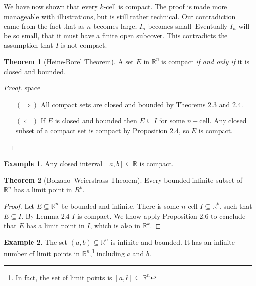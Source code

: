 \documentclass{article}
\newcommand{\R}{\mathbb{R}}
\theoremstyle{definition}
\newtheorem{theorem}{Theorem}[section]
\newtheorem{example}{Example}[section]
\begin{document}
	We have now shown that every $ k $-cell is compact. The proof is made more manageable with illustrations, but is still rather technical. Our contradiction came from the fact that as $ n $ becomes large, $ I_n $ becomes small. Eventually $ I_n $ will be so small, that it must have a finite open subcover. This contradicts the assumption that $ I $ is not compact. 
	\begin{theorem}[Heine-Borel Theorem]
		A set $ E $ in $ \R^n $ is compact \textit{if and only if} it is closed and bounded.
	\end{theorem} 
	\begin{proof}{\color{white}space}
		\begin{enumerate}
			\item [$ (\Longrightarrow) $] All compact sets are closed and bounded by Theorems 2.3 and 2.4. 
			\item [$ (\Longleftarrow) $] If $ E $ is closed and bounded then $ E\subseteq I $ for some $ n -$cell. Any closed subset of a compact set is compact by Proposition 2.4, so $ E $ is compact.
		\end{enumerate}
	\end{proof}
	\begin{example}
		Any closed interval $ [a,b]\subseteq \R$ is compact. 
	\end{example}
	\begin{theorem}[Bolzano–Weierstrass Theorem]
		Every bounded infinite subset of $ \R^n $ has a limit point in $ R^k $. 
	\end{theorem}
	\begin{proof}
		Let $ E\subseteq\R^n $ be bounded and infinite. There is some $ n $-cell $ I\subseteq\R^k $, such that $ E\subseteq I $. By Lemma 2.4 $ I $ is compact. We know apply Proposition 2.6 to conclude that $ E $ has a limit point in $ I $, which is also in $ \R^k $.
	\end{proof}
	\begin{example}
		The set $ (a,b)\subseteq\R^n $ is infinite and bounded. It has an infinite number of limit points in $ \R^n $,\footnote{In fact, the set of limit points is $ [a,b]\subseteq\R^n $} including $ a $ and $ b $.
	\end{example}
\end{document}
